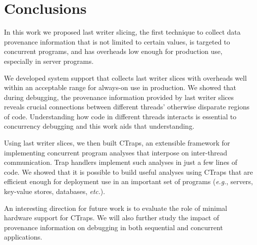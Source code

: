 \documentclass[preprint,10pt]{sigplanconf}
\newcommand{\ctraps}{CTraps\xspace}
\begin{document}
\section{Conclusions}
In this work we proposed last writer slicing, the first technique to collect data provenance information
that is not limited to certain values, is targeted to concurrent programs, and
has overheads low enough for production use, especially in server programs. 

We developed system support that collects last writer slices with overheads
well within an acceptable range for always-on use in production.  We showed
that during debugging, the provenance information provided by last writer
slices reveals crucial connections between different threads' otherwise
disparate regions of code.  Understanding how code in different threads
interacts is essential to concurrency debugging and this work aids that
understanding.

Using last writer slices, we then built \ctraps, an extensible framework for
implementing concurrent program analyses that interpose on inter-thread
communication.  Trap handlers implement such analyses in just a few lines of
code.  We showed that it is possible to build useful analyses using \ctraps
that are efficient enough for deployment use in an important set of programs
({\em e.g.}, servers, key-value stores, databases, {\em etc.}).  

An interesting direction for future work is to evaluate the role of minimal
hardware support for \ctraps.  We will also further study the impact of
provenance information on debugging in both sequential and concurrent
applications. 




{}

\end{document}
